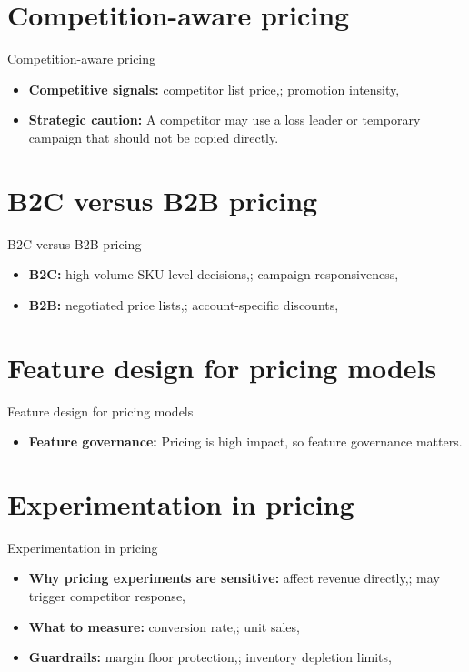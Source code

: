 \documentclass[aspectratio=169]{beamer}
\begin{document}
\section{Competition-aware pricing}

\begin{frame}{Competition-aware pricing}
  \begin{itemize}
    \item \textbf{Competitive signals:} competitor list price,; promotion intensity,
    \item \textbf{Strategic caution:} A competitor may use a loss leader or temporary campaign that should not be copied directly.
  \end{itemize}
\end{frame}

\section{B2C versus B2B pricing}

\begin{frame}{B2C versus B2B pricing}
  \begin{itemize}
    \item \textbf{B2C:} high-volume SKU-level decisions,; campaign responsiveness,
    \item \textbf{B2B:} negotiated price lists,; account-specific discounts,
  \end{itemize}
\end{frame}

\section{Feature design for pricing models}

\begin{frame}{Feature design for pricing models}
  \begin{itemize}
    \item \textbf{Feature governance:} Pricing is high impact, so feature governance matters.
  \end{itemize}
\end{frame}

\section{Experimentation in pricing}

\begin{frame}{Experimentation in pricing}
  \begin{itemize}
    \item \textbf{Why pricing experiments are sensitive:} affect revenue directly,; may trigger competitor response,
    \item \textbf{What to measure:} conversion rate,; unit sales,
    \item \textbf{Guardrails:} margin floor protection,; inventory depletion limits,
  \end{itemize}
\end{frame}
\end{document}
